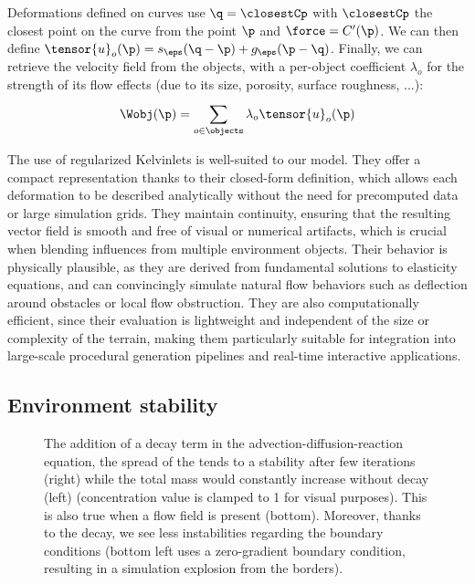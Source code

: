 Deformations defined on curves use $\q = \closestCp$ with $\closestCp$ the closest point on the curve from the point $\p$ and $\force = C'(\p)$. We can then define $\tensor{u}_o(\p) = s_\eps(\q - \p) + g_\eps(\p - \q)$.
Finally, we can retrieve the velocity field from the objects, with a per-object coefficient $\lambda_o$ for the strength of its flow effects (due to its size, porosity, surface roughness, ...):
\begin{align}
    \Wobj(\p) = \sum_{o \in \objects}^{}{\lambda_o \tensor{u}_o(\p)}
\end{align}

The use of regularized Kelvinlets is well-suited to our model. They offer a compact representation thanks to their closed-form definition, which allows each deformation to be described analytically without the need for precomputed data or large simulation grids. They maintain continuity, ensuring that the resulting vector field is smooth and free of visual or numerical artifacts, which is crucial when blending influences from multiple environment objects. Their behavior is physically plausible, as they are derived from fundamental solutions to elasticity equations, and can convincingly simulate natural flow behaviors such as deflection around obstacles or local flow obstruction. They are also computationally efficient, since their evaluation is lightweight and independent of the size or complexity of the terrain, making them particularly suitable for integration into large-scale procedural generation pipelines and real-time interactive applications.


\subsection{Environment stability}
\begin{figure}[H]
    \centering
    \caption{The addition of a decay term in the advection-diffusion-reaction equation, the spread of the  tends to a stability after few iterations (right) while the total mass would constantly increase without decay (left) (concentration value is clamped to 1 for visual purposes). This is also true when a flow field is present (bottom). Moreover, thanks to the decay, we see less instabilities regarding the boundary conditions (bottom left uses a zero-gradient boundary condition, resulting in a simulation explosion from the borders). }
    \label{fig:env-obj_stability-examples}
\end{figure}

